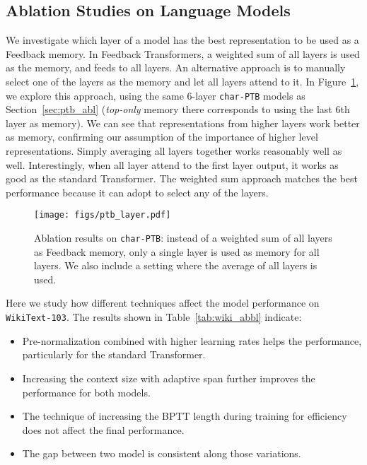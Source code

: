 \documentclass{article} \usepackage{iclr2021_conference}
\newcommand{\secc}[1]{Section~\ref{sec:#1}}
\newcommand{\fig}[1]{Figure~\ref{fig:#1}}
\newcommand{\tab}[1]{Table~\ref{tab:#1}}
\begin{document}
\subsection{Ablation Studies on Language Models}
\label{app:lm_abl}

We investigate which layer of a model has the best representation to be used as a Feedback memory.
In Feedback Transformers, a weighted sum of all layers is used as the memory, and feeds to all layers.
An alternative approach is to manually select one of the layers as the memory and let all layers attend to it. 
In \fig{ptb_layer}, we explore this approach, using the same 6-layer \texttt{char-PTB} models as \secc{ptb_abl} (\textit{top-only} memory there corresponds to using the last 6th layer as memory).
We can see that representations from higher layers work better as memory, confirming our assumption of the importance of higher level representations. 
Simply averaging all layers together works reasonably well as well. 
Interestingly, when all layer attend to the first layer output, it works as good as the standard Transformer. 
The weighted sum approach matches the best performance because it can adopt to select any of the layers. 

\begin{figure}
    \centering
    \texttt{[image: figs/ptb\_layer.pdf]}
    \caption{Ablation results on \texttt{char-PTB}: instead of a weighted sum of all layers as Feedback memory, only a single layer is used as memory for all layers. We also include a setting where the average of all layers is used.}
    \label{fig:ptb_layer}
\end{figure}

Here we study how different techniques affect the model performance on \texttt{WikiText-103}.
The results shown in \tab{wiki_abbl} indicate: 
\begin{itemize}
    \item Pre-normalization combined with higher learning rates helps the performance, particularly for the standard Transformer.
    \item Increasing the context size with adaptive span further improves the performance for both models.
    \item The technique of increasing the BPTT length during training for efficiency does not affect the final performance.
    \item The gap between two model is consistent along those variations.
\end{itemize}
\end{document}
